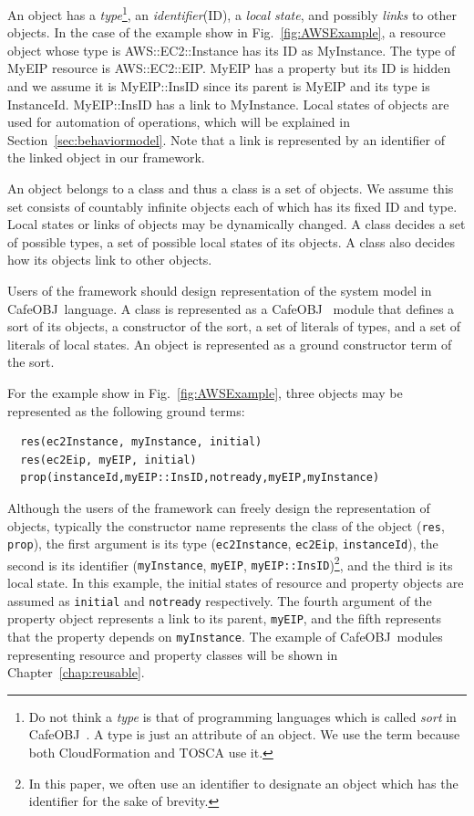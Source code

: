 \documentclass[12pt]{report}
\newcommand{\cafeobj}{{\sf CafeOBJ}~}
\begin{document}
An object has a {\it type}\footnote{Do not think a {\it type} is that
  of programming languages which is called {\it sort} in \cafeobj. A
  type is just an attribute of an object. We use the term because both
  CloudFormation and TOSCA use it.}, an {\it identifier}(ID), a {\it
  local state}, and possibly {\it links} to other objects. In the case
of the example show in Fig.~\ref{fig:AWSExample}, a resource object
whose type is AWS::EC2::Instance has its ID as MyInstance. The type of
MyEIP resource is AWS::EC2::EIP. MyEIP has a property but its ID is
hidden and we assume it is MyEIP::InsID since its parent is MyEIP and
its type is InstanceId. MyEIP::InsID has a link to MyInstance. Local
states of objects are used for automation of operations, which will be
explained in Section~\ref{sec:behaviormodel}. Note that a link is
represented by an identifier of the linked object in our framework.

An object belongs to a class and thus a class is a set of objects. We
assume this set consists of countably infinite objects each of which
has its fixed ID and type. Local states or links of objects may be
dynamically changed.  A class decides a set of possible types, a set
of possible local states of its objects. A class also decides how its
objects link to other objects.

Users of the framework should design representation of the system
model in \cafeobj language.  A class is represented as a \cafeobj
module that defines a sort of its objects, a constructor of the sort,
a set of literals of types, and a set of literals of local states.  An
object is represented as a ground constructor term of the sort.

For the example show in Fig.~\ref{fig:AWSExample}, three objects may
be represented as the following ground terms:
\begin{verbatim}
  res(ec2Instance, myInstance, initial)
  res(ec2Eip, myEIP, initial)
  prop(instanceId,myEIP::InsID,notready,myEIP,myInstance)
\end{verbatim}
Although the users of the framework can freely design the
representation of objects, typically the constructor name represents
the class of the object ({\tt res}, {\tt prop}), the first argument is
its type ({\tt ec2Instance}, {\tt ec2Eip}, {\tt instanceId}), the
second is its identifier ({\tt myInstance}, {\tt myEIP},
{\tt myEIP::InsID})\footnote{In this paper, we often use an identifier
  to designate an object which has the identifier for the sake of
  brevity.}, and the third is its local state. In this example, the
initial states of resource and property objects are assumed as
{\tt initial} and {\tt notready} respectively. The fourth argument of the
property object represents a link to its parent, {\tt myEIP}, and the
fifth represents that the property depends on {\tt myInstance}. The
example of \cafeobj modules representing resource and property classes
will be shown in Chapter~\ref{chap:reusable}.
\end{document}

